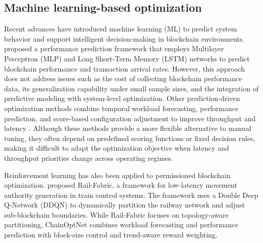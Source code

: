 \documentclass[a4paper,fleqn]{cas-dc}
\begin{document}
\subsection{Machine learning-based optimization}
\vspace{6pt}
Recent advances have introduced machine learning (ML) to predict system behavior and support intelligent decision-making in blockchain environments. \citet{wang2022bpr} proposed a performance prediction framework that employs Multilayer Perceptron (MLP) and Long Short-Term Memory (LSTM) networks to predict blockchain performance and transaction arrival rates. However, this approach does not address issues such as the cost of collecting blockchain performance data, its generalization capability under small sample sizes, and the integration of predictive modeling with system-level optimization. Other prediction-driven optimization methods combine temporal workload forecasting, performance prediction, and score-based configuration adjustment to improve throughput and latency \citep{wang2023learningchain}. Although these methods provide a more flexible alternative to manual tuning, they often depend on predefined scoring functions or fixed decision rules, making it difficult to adapt the optimization objective when latency and throughput priorities change across operating regimes.


Reinforcement learning has also been applied to permissioned blockchain optimization. \citet{tang2026enhancing} proposed Rail-Fabric, a framework for low-latency movement authority generation in train control systems. The framework uses a Double Deep Q-Network (DDQN) to dynamically partition the railway network and adjust sub-blockchain boundaries. While Rail-Fabric focuses on topology-aware partitioning, ChainOptNet combines workload forecasting and performance prediction with block-size control and trend-aware reward weighting.



	
\end{document}
